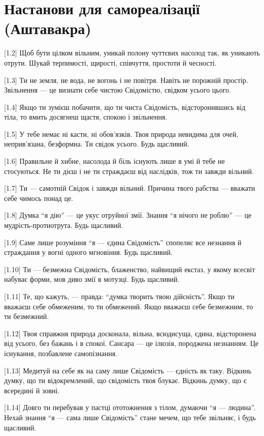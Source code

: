 \chapter[(Аштавакра)]{Настанови для самореалізації (Аштавакра)}

[1.2] Щоб бути цілком вільним, уникай полону чуттєвих насолод так, як уникають отрути. Шукай терпимості, щирості, співчуття, простоти й чесності.

[1.3] Ти не земля, не вода, не вогонь і не повітря. Навіть не порожній простір. Звільнення --- це визнати себе чистою Свідомістю, свідком усього цього.

[1.4] Якщо ти зумієш побачити, що ти чиста Свідомість, відсторонившись від тіла, то вмить досягнеш щастя, спокою і звільнення.

[1.5] У тебе немає ні касти, ні обов'язків. Твоя природа невидима для очей, неприв'язана, безформна. Ти свідок усього. Будь щасливий.

[1.6] Правильне й хибне, насолода й біль існують лише в умі й тебе не стосуються. Не ти дієш і не ти страждаєш від наслідків, тож ти завжди вільний.

[1.7] Ти --- самотній Свідок і завжди вільний. Причина твого рабства --- вважати себе чимось понад це.

[1.8] Думка ``я дію'' --- це укус отруйної змії. Знання ``я нічого не роблю'' --- це мудрість-протиотрута. Будь щасливий.

[1.9] Саме лише розуміння ``я --- єдина Свідомість'' спопеляє все незнання й страждання у вогні одного мгновіння. Будь щасливий.

[1.10] Ти --- безмежна Свідомість, блаженство, найвищий екстаз, у якому всесвіт набуває форми, мов диво змії в мотузці. Будь щасливий.

[1.11] Те, що кажуть, --- правда: ``думка творить твою дійсність''. Якщо ти вважаєш себе обмеженим, то ти обмежений. Якщо вважаєш себе безмежним, то ти безмежний.

[1.12] Твоя справжня природа досконала, вільна, всюдисуща, єдина, відсторонена від усього, без бажань і в спокої. Сансара --- це ілюзія, породжена незнанням. Це існування, позбавлене самопізнання.

[1.13] Медитуй на себе як на саму лише Свідомість --- єдність як таку. Відкинь думку, що ти відокремлений, що свідомість твоя блукає. Відкинь думку, що є всередині й зовні.

[1.14] Довго ти перебував у пастці ототожнення з тілом, думаючи ``я --- людина''. Нехай знання ``я --- сама лише Свідомість'' стане мечем, що тебе звільняє, і будь щасливий.

